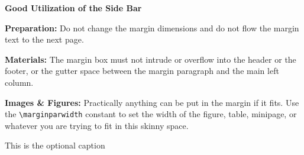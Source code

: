 \documentclass[sigchi-a, authorversion]{acmart}
\begin{document}


\begin{abstract}
  UPDATED---\today.
  
  In todays society electronics become a more and more crucial part of our lives. The demand for electronic devices increases and so does the amount of waste we produce with them. E-waste is a term used for old electronic devices that are of no use anymore and thus become scrap. This causes serious pollution to our surroundings and other countries since most of the e-waste is being exported to third world countries. \\
  Our goal is to find a solution to this pollution problem. Our plan is to create a trading system similar to the CO2 trading system of the European Union. Countries are allowed to only export a certain amount of e-waste. This amount can be increased if they either buy allowances from other countries or if they invest in recycling of e-waste. The global e-waste export limits will be lowered year by year, thus lowering global pollution created by no longer used electronics.  
  
  
\end{abstract}





\maketitle

\begin{sidebar}
  \textbf{Good Utilization of the Side Bar} 
  
  \textbf{Preparation:} Do not change the margin
  dimensions and do not flow the margin text to the
  next page. 
  
  \textbf{Materials:} The margin box must not intrude
  or overflow into the header or the footer, or the gutter space
  between the margin paragraph and the main left column. 
  
  \textbf{Images \& Figures:} Practically anything
  can be put in the margin if it fits. Use the
  \texttt{{\textbackslash}marginparwidth} constant to set the
  width of the figure, table, minipage, or whatever you are trying
  to fit in this skinny space.

  \caption{This is the optional caption}
  \label{bar:sidebar}
\end{sidebar}
\end{document}
